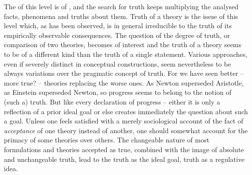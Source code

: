 \pa The  of this level is  of
, and the search for truth keeps multiplying the analysed facts,
phenomena and truths about them.  Truth of a theory is the issue of this level
which, as has been observed, is in general  irreducible to the truth of
its empirically observable consequences. The question of the degree of truth, or
comparison of two theories, becomes of interest and the truth of a theory
seems to be of a different kind than the truth of a single statement.  Various
approaches, even if severely distinct in conceptual constructions, seem
nevertheless to be always variations over the pragmatic concept of truth. For we
have seen better -- more true? -- theories replacing the worse ones.  As Newton
superseded Aristotle, as Einstein superseded Newton, so progress seems to
belong to the notion of (such a) truth. But like every declaration of progress
-- either it is only a reflection of a prior ideal goal or else creates
immediately the question about such a goal.  Unless one feels satisfied with a
merely sociological account of the fact of {\em acceptance} of one theory
instead of another, one should somewhat account for the primacy
of some theories over others.
The changeable nature of most formulations and theories accepted as true,
combined with the image of absolute and unchangeable truth, lead to the truth as
the  ideal goal, truth as a regulative idea.

